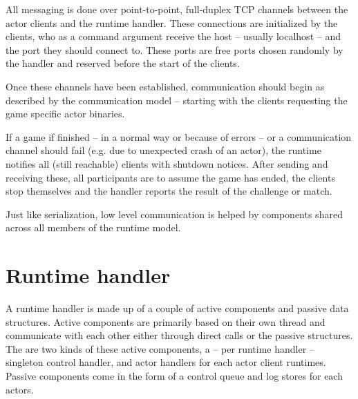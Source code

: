 		All messaging is done over point-to-point, full-duplex TCP channels between the actor clients and the runtime handler. These connections are initialized by the clients, who as a command argument receive the host -- usually localhost -- and the port they should connect to. These ports are free ports chosen randomly by the handler and reserved before the start of the clients.
		
		Once these channels have been established, communication should begin as described by the communication model -- starting with the clients requesting the game specific actor binaries.
		
		If a game if finished -- in a normal way or because of errors -- or a communication channel should fail (e.g. due to unexpected crash of an actor), the runtime notifies all (still reachable) clients with shutdown notices. After sending and receiving these, all participants are to assume the game has ended, the clients stop themselves and the handler reports the result of the challenge or match.

		Just like serialization, low level communication is helped by components shared across all members of the runtime model.

	\section{Runtime handler}

	A runtime handler is made up of a couple of active components and passive data structures. Active components are primarily based on their own thread and communicate with each other either through direct calls or the passive structures.
	The are two kinds of these active components, a -- per runtime handler -- singleton control handler, and actor handlers for each actor client runtimes. Passive components come in the form of a control queue and log stores for each actors.
		
